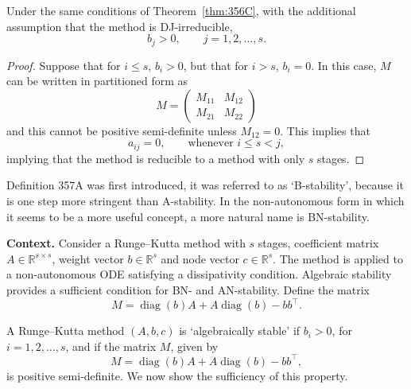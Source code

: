 \begin{corollary}

  \label{cor:356D}
Under the same conditions of Theorem~\ref{thm:356C}, with the additional assumption that the method is DJ-irreducible,
\[
b_j > 0, \qquad j = 1, 2, \dots, s.
\]
\end{corollary}

\begin{proof}
Suppose that for \( i \leq s \), \( b_i > 0 \), but that for \( i > s \), \( b_i = 0 \). In this case, \( M \) can be written in partitioned form as
\[
M = \begin{pmatrix}
M_{11} & M_{12} \\
M_{21} & M_{22}
\end{pmatrix}
\]
and this cannot be positive semi-definite unless \( M_{12} = 0 \). This implies that
\[
a_{ij} = 0, \qquad \text{whenever } i \leq s < j,
\]
implying that the method is reducible to a method with only \( s \) stages.
\end{proof}

\begin{definition}[B-stability (357A)]

  \label{def:357A}
Definition 357A was first introduced, it was referred to as `B-stability', because it is one step more stringent than A-stability. In the non-autonomous form in which it seems to be a more useful concept, a more natural name is BN-stability.
\end{definition}

\noindent\textbf{Context.}
Consider a Runge--Kutta method with $s$ stages, coefficient matrix $A\in\mathbb{R}^{s\times s}$, weight vector $b\in\mathbb{R}^{s}$ and node vector $c\in\mathbb{R}^{s}$. The method is applied to a non-autonomous ODE satisfying a dissipativity condition. Algebraic stability provides a sufficient condition for BN- and AN-stability. Define the matrix
\[
M = \operatorname{diag}(b)A + A\operatorname{diag}(b) - bb^{\top}.
\]

\begin{definition}

  \label{def:357B}
A Runge--Kutta method $(A, b, c)$ is `algebraically stable' if
$b_i > 0$, for $i = 1, 2, \dots, s$, and if the matrix $M$, given by
\[
M = \operatorname{diag}(b)A + A\operatorname{diag}(b) - bb^\top,
\tag{357d}
\]
is positive semi-definite.
We now show the sufficiency of this property.
\end{definition}

